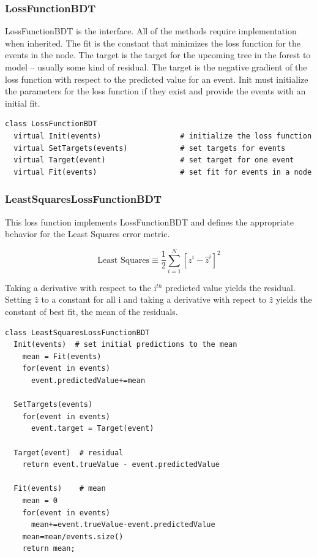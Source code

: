 \documentclass[12pt]{article}
\begin{document}
\subsubsection{LossFunctionBDT}

LossFunctionBDT is the interface. All of the methods require implementation when inherited. The fit is the constant that minimizes the loss function for the events in the node. The target is the target for the upcoming tree in the forest to model -- usually some kind of residual. The target is the negative gradient of the loss function with respect to the predicted value for an event. Init must initialize the parameters for the loss function if they exist and provide the events with an initial fit.  

\begin{verbatim}
class LossFunctionBDT
  virtual Init(events)                  # initialize the loss function
  virtual SetTargets(events)            # set targets for events
  virtual Target(event)                 # set target for one event
  virtual Fit(events)                   # set fit for events in a node
\end{verbatim}

\subsubsection{LeastSquaresLossFunctionBDT}

This loss function implements LossFunctionBDT and defines the appropriate behavior for the Least Squares error metric.

\begin{equation}
\textrm{Least Squares} \equiv \frac{1}{2}\sum_{i=1}^{N} [z^i-\hat{z}^i]^2
\end{equation}

Taking a derivative with respect to the i$^{th}$ predicted value yields the residual. Setting $\hat{z}$ to a constant for all i and taking a derivative with repect to $\hat{z}$ yields the constant of best fit, the mean of the residuals.    

\begin{verbatim}
class LeastSquaresLossFunctionBDT
  Init(events)  # set initial predictions to the mean
    mean = Fit(events)
    for(event in events)
      event.predictedValue+=mean

  SetTargets(events)  
    for(event in events)  
      event.target = Target(event)

  Target(event)  # residual                 
    return event.trueValue - event.predictedValue

  Fit(events)    # mean                 
    mean = 0
    for(event in events)
      mean+=event.trueValue-event.predictedValue
    mean=mean/events.size()
    return mean;

\end{verbatim}
\end{document}
